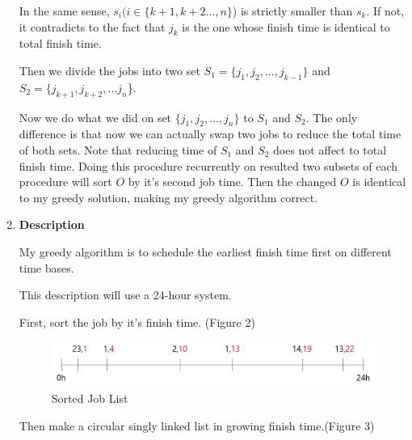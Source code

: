 \documentclass[a4paper,11pt]{article}
\begin{document}
\begin{enumerate}
In the same sense, $s_i(i\in \{k+1,k+2\dots,n\}$) is strictly smaller than $s_k$. If not, it contradicts to the fact that $j_k$ is the one whose finish time is identical to total finish time.

Then we divide the jobs into two set $S_1=\{{j_1, j_2, ..., j_{k-1}}\}$ and $S_2=\{{j_{k+1}, j_{k+2}, ... j_n}$\}.

Now we do what we did on set ${\{j_1,j_2,...,j_n\}}$ to $S_1$ and $S_2$. 
The only difference is that now we can actually swap two jobs to reduce the total time of both sets. 
Note that reducing time of $S_1$ and $S_2$ does not affect to total finish time.
Doing this procedure recurrently on resulted two subsets of each procedure will sort $O$ by it's second job time.
Then the changed $O$ is identical to my greedy solution, making my greedy algorithm correct.



\pagebreak

\item 

{\bf Description}

My greedy algorithm is to schedule the earliest finish time first on different time bases.

This description will use a 24-hour system. 

First, sort the job by it's finish time. (Figure 2)

\begin{figure}[hbt]
	\centering
	\includegraphics[scale=0.4]{figure2.png}
	\caption{Sorted Job List}
\end{figure}
Then make a circular singly linked list in growing finish time.(Figure 3)


\end{enumerate}
\end{document}
